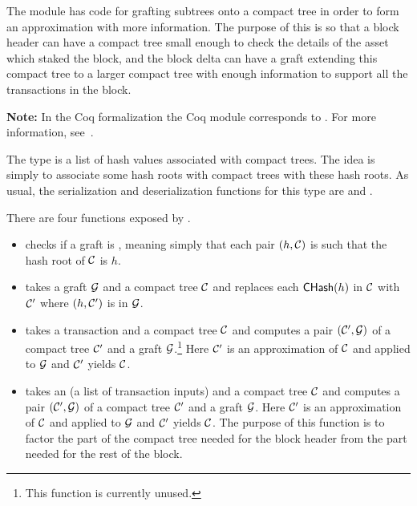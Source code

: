 The module {}
has code for grafting subtrees onto a compact tree in order
to form an approximation with more information.
The purpose of this is so that a block header can
have a compact tree small enough to check the details of the asset which
staked the block,
and the block delta can have a graft extending this compact tree
to a larger compact tree with enough information to support
all the transactions in the block.

{\bf{Note:}} 
In the Coq formalization the Coq module {}
corresponds to {}.
For more information, see~\cite{White2015b}.

The type {} is a list of hash values associated with compact trees.
The idea is simply to associate some hash roots with compact trees with these hash roots.
As usual, the serialization and deserialization functions
for this type are
{}
and
{}.

There are four functions exposed by {}.
\begin{itemize}
\item {} checks if a graft is {}, meaning simply that
each pair $(h,\mathcal{C})$ is such that the hash root of $\mathcal{C}$ is $h$.
\item {} takes a graft $\mathcal{G}$ and a compact tree $\mathcal{C}$
and replaces each ${\constr{CHash}}(h)$ in $\mathcal{C}$ with $\mathcal{C}'$
where $(h,\mathcal{C}')$ is in $\mathcal{G}$.
\item {} takes a transaction and a compact tree $\mathcal{C}$
and computes a pair $(\mathcal{C}',\mathcal{G})$ of a compact tree $\mathcal{C}'$ and a graft $\mathcal{G}$.\footnote{This function is currently unused.}
Here $\mathcal{C}'$ is an approximation of $\mathcal{C}$
and {} applied to $\mathcal{G}$ and $\mathcal{C}'$ yields $\mathcal{C}$.
\item {} takes an {}
(a list of transaction inputs)
and a compact tree $\mathcal{C}$
and computes a pair $(\mathcal{C}',\mathcal{G})$ of a compact tree $\mathcal{C}'$ and a graft $\mathcal{G}$.
Here $\mathcal{C}'$ is an approximation of $\mathcal{C}$
and {} applied to $\mathcal{G}$ and $\mathcal{C}'$ yields $\mathcal{C}$.
The purpose of this function is to factor the part of the compact tree
needed for the block header from the part needed for the rest of the block.
\end{itemize}
